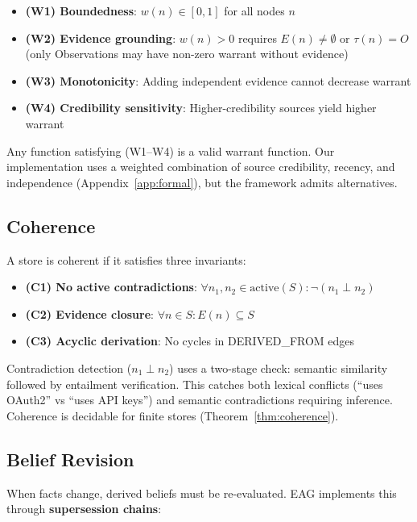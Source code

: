 \documentclass[11pt,letterpaper]{article}
\begin{document}
\begin{itemize}[noitemsep]
    \item \textbf{(W1) Boundedness}: $w(n) \in [0,1]$ for all nodes $n$
    \item \textbf{(W2) Evidence grounding}: $w(n) > 0$ requires $E(n) \neq \emptyset$ or $\tau(n) = O$ (only Observations may have non-zero warrant without evidence)
    \item \textbf{(W3) Monotonicity}: Adding independent evidence cannot decrease warrant
    \item \textbf{(W4) Credibility sensitivity}: Higher-credibility sources yield higher warrant
\end{itemize}

Any function satisfying (W1--W4) is a valid warrant function. Our implementation uses a weighted combination of source credibility, recency, and independence (Appendix~\ref{app:formal}), but the framework admits alternatives.

\subsection{Coherence}

A store is coherent if it satisfies three invariants:

\begin{itemize}[noitemsep]
    \item \textbf{(C1) No active contradictions}: $\forall n_1, n_2 \in \text{active}(S): \neg(n_1 \perp n_2)$
    \item \textbf{(C2) Evidence closure}: $\forall n \in S: E(n) \subseteq S$
    \item \textbf{(C3) Acyclic derivation}: No cycles in DERIVED\_FROM edges
\end{itemize}

Contradiction detection ($n_1 \perp n_2$) uses a two-stage check: semantic similarity followed by entailment verification. This catches both lexical conflicts (``uses OAuth2'' vs ``uses API keys'') and semantic contradictions requiring inference. Coherence is decidable for finite stores (Theorem~\ref{thm:coherence}).

\subsection{Belief Revision}

When facts change, derived beliefs must be re-evaluated. EAG implements this through \textbf{supersession chains}:
\end{document}
